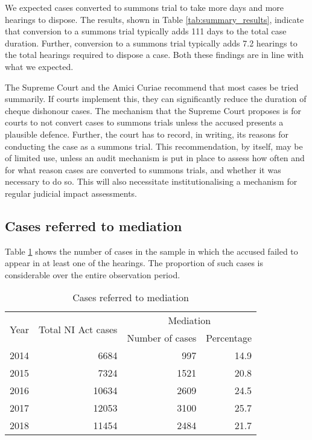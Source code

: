 We expected cases converted to summons trial to take more days and more hearings to dispose. The results, shown in Table \ref{tab:summary_results}, indicate that conversion to a summons trial typically adds 111 days to the total case duration. Further, conversion to a summons trial typically adds 7.2 hearings to the total hearings required to dispose a case. Both these findings are in line with what we expected.

The Supreme Court and the Amici Curiae recommend that most cases be tried summarily. If courts implement this, they can significantly reduce the duration of cheque dishonour cases. The mechanism that the Supreme Court proposes is for courts to not convert cases to summons trials unless the accused presents a plausible defence. Further, the court has to record, in writing, its reasons for conducting the case as a summons trial. This recommendation, by itself, may be of limited use, unless an audit mechanism is put in place to assess how often and for what reason cases are converted to summons trials, and whether it was necessary to do so. This will also necessitate institutionalising a mechanism for regular judicial impact assessments.

\subsection{Cases referred to mediation}
\label{sec:mediation}

Table \ref{tab:mediation_yearWise} shows the number of cases in the sample in which the accused failed to appear in at least one of the hearings. The proportion of such cases is considerable over the entire observation period.

\begin{longtable}{@{}lrrr@{}}
 \caption{Cases referred to mediation}\label{tab:mediation_yearWise}\\
 \toprule
 \multirow{2}{*}{Year} & \multirow{2}{*}{Total NI Act cases} & \multicolumn{2}{c}{Mediation}\\
 \cmidrule{3-4}
 && Number of cases & Percentage \\
 \midrule\endhead
 2014 & 6684 & 997 & 14.9 \\
 2015 & 7324 & 1521 & 20.8 \\
 2016 & 10634 & 2609 & 24.5 \\
 2017 & 12053 & 3100 & 25.7 \\
 2018 & 11454 & 2484 & 21.7 \\
 \bottomrule
\end{longtable}

